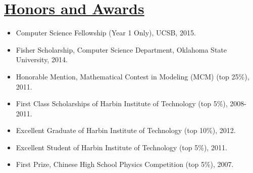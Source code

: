 \documentclass{article}
\newlength{\nL}
\newcommand{\underLineText}[1]{\settowidth{\nL}{#1}\setlength{\nL}{0.95\textwidth-\nL}\underline{{\sc #1}\hspace{\nL}}}
\begin{document}
\section*{\underLineText{Honors and Awards}}
\begin{itemize}
\item Computer Science Fellowship (Year 1 Only), UCSB, 2015.
\item Fisher Scholarship, Computer Science Department, Oklahoma State University, 2014.
\item Honorable Mention, Mathematical Contest in Modeling (MCM) (top 25\%), 2011.
\item First Class Scholarships of Harbin Institute of Technology (top 5\%), 2008-2011.
\item Excellent Graduate of Harbin Institute of Technology (top 10\%), 2012.
\item Excellent Student of Harbin Institute of Technology (top 5\%), 2011.
\item First Prize, Chinese High School Physics Competition (top 5\%), 2007.
\end{itemize}
\end{document}
